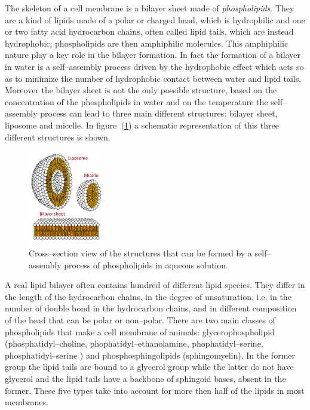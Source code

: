 The skeleton of a cell membrane is a bilayer sheet made of \textit{phospholipids}. They are a kind of lipids made of a polar or charged head, which is hydrophilic and one or two fatty acid hydrocarbon chains, often called lipid tails, which are instead hydrophobic; phospholipids are then amphiphilic molecules. This amphiphilic nature play a key role in the bilayer formation. In fact the formation of a bilayer in water is a self--assembly process driven by the hydrophobic effect which acts so as to minimize the number of hydrophobic contact between water and lipid tails. Moreover the bilayer sheet is not the only possible structure, based on the concentration of the phospholipids in water and on the temperature the self--assembly process can lead to three main different structures: bilayer sheet, liposome and micelle. In figure~(\ref{fig:lipidsStructures}) a schematic representation of this three different structures is shown.
\begin{figure}
	\includegraphics[width=0.3\textwidth]{./img/lipidsStructures}
	\caption{Cross--section view of the structures that can be formed by a self--assembly process of phospholipids in aqueous solution.}
	\label{fig:lipidsStructures}
\end{figure}

A real lipid bilayer often contains hundred of different lipid species. They differ in the length of the hydrocarbon chains, in the degree of unsaturation, i.e. in the number of double bond in the hydrocarbon chains, and in different composition of the head that can be polar or non--polar. There are two main classes of phospholipids that make a cell membrane of animals: glycerophospholipid (phosphatidyl--choline, phophatidyl--ethanolamine, phophatidyl--serine, phosphatidyl--serine ) and phosphosphingolipids (sphingomyelin). In the former group the lipid tails are bound to a glycerol group while the latter do not have glycerol and the lipid tails have a backbone of sphingoid bases, absent in the former. These five types take into account for more then half of the lipids in most membranes.

